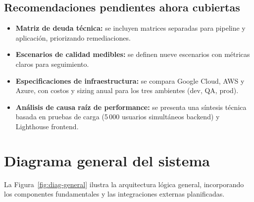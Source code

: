 \documentclass[12pt,letterpaper]{article}
\begin{document}
\subsection{Recomendaciones pendientes ahora cubiertas}
\begin{itemize}[leftmargin=1.2cm]
  \item \textbf{Matriz de deuda técnica:} se incluyen matrices separadas para pipeline y aplicación, priorizando remediaciones.
  \item \textbf{Escenarios de calidad medibles:} se definen nueve escenarios con métricas claros para seguimiento.
  \item \textbf{Especificaciones de infraestructura:} se compara Google Cloud, AWS y Azure, con costos y sizing anual para los tres ambientes (dev, QA, prod).
  \item \textbf{Análisis de causa raíz de performance:} se presenta una síntesis técnica basada en pruebas de carga (5\,000 usuarios simultáneos backend) y Lighthouse frontend.
\end{itemize}

\section{Diagrama general del sistema}
La Figura~\ref{fig:diag-general} ilustra la arquitectura lógica general, incorporando los componentes fundamentales y las integraciones externas planificadas.
\end{document}
